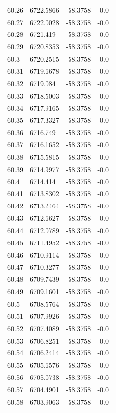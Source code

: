 \begin{table}[H]
\begin{tabular}{llll}
60.26 & 6722.5866 & -58.3758 & -0.0 \\
60.27 & 6722.0028 & -58.3758 & -0.0 \\
60.28 & 6721.419 & -58.3758 & -0.0 \\
60.29 & 6720.8353 & -58.3758 & -0.0 \\
60.3 & 6720.2515 & -58.3758 & -0.0 \\
60.31 & 6719.6678 & -58.3758 & -0.0 \\
60.32 & 6719.084 & -58.3758 & -0.0 \\
60.33 & 6718.5003 & -58.3758 & -0.0 \\
60.34 & 6717.9165 & -58.3758 & -0.0 \\
60.35 & 6717.3327 & -58.3758 & -0.0 \\
60.36 & 6716.749 & -58.3758 & -0.0 \\
60.37 & 6716.1652 & -58.3758 & -0.0 \\
60.38 & 6715.5815 & -58.3758 & -0.0 \\
60.39 & 6714.9977 & -58.3758 & -0.0 \\
60.4 & 6714.414 & -58.3758 & -0.0 \\
60.41 & 6713.8302 & -58.3758 & -0.0 \\
60.42 & 6713.2464 & -58.3758 & -0.0 \\
60.43 & 6712.6627 & -58.3758 & -0.0 \\
60.44 & 6712.0789 & -58.3758 & -0.0 \\
60.45 & 6711.4952 & -58.3758 & -0.0 \\
60.46 & 6710.9114 & -58.3758 & -0.0 \\
60.47 & 6710.3277 & -58.3758 & -0.0 \\
60.48 & 6709.7439 & -58.3758 & -0.0 \\
60.49 & 6709.1601 & -58.3758 & -0.0 \\
60.5 & 6708.5764 & -58.3758 & -0.0 \\
60.51 & 6707.9926 & -58.3758 & -0.0 \\
60.52 & 6707.4089 & -58.3758 & -0.0 \\
60.53 & 6706.8251 & -58.3758 & -0.0 \\
60.54 & 6706.2414 & -58.3758 & -0.0 \\
60.55 & 6705.6576 & -58.3758 & -0.0 \\
60.56 & 6705.0738 & -58.3758 & -0.0 \\
60.57 & 6704.4901 & -58.3758 & -0.0 \\
60.58 & 6703.9063 & -58.3758 & -0.0 \\

\end{tabular}
\end{table}
